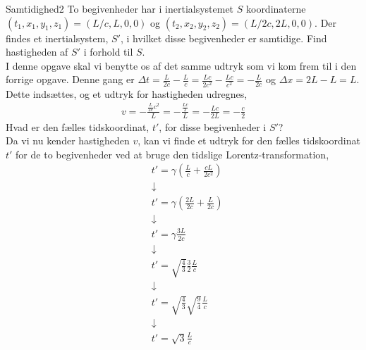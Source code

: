 \documentclass[crop=false, class=memoir]{standalone}
\begin{document}
\begin{opgave}{Samtidighed}{2}
	To begivenheder har i inertialsystemet $S$ koordinaterne $(t_1,x_1,y_1,z_1)=(L/c,L,0,0)$ og $(t_2,x_2,y_2,z_2)=(L/2c,2L,0,0)$.
	\opg Der findes et inertialsystem, $S'$, i hvilket disse begivenheder er samtidige. Find hastigheden af $S'$ i forhold til $S$.\\
	
	I denne opgave skal vi benytte os af det samme udtryk som vi kom frem til i den forrige opgave. Denne gang er $\Delta t=\frac{L}{2c}-\frac{L}{c}=\frac{Lc}{2c^2}-\frac{Lc}{c^2}=-\frac{L}{2c}$ og $\Delta x=2L-L=L$. Dette indsættes, og et udtryk for hastigheden udregnes,
	\begin{align*}
		v=-\frac{\frac{L}{2c}c^2}{L}=-\frac{\frac{Lc}{2}}{L}=-\frac{Lc}{2L}=-\frac{c}{2}
	\end{align*}
	\opg Hvad er den fælles tidskoordinat, $t'$, for disse begivenheder i $S'$?\\
	
	Da vi nu kender hastigheden $v$, kan vi finde et udtryk for den fælles tidskoordinat $t'$ for de to begivenheder ved at bruge den tidslige Lorentz-transformation,
	\begin{align*}
		&t'=\gamma(\frac{L}{c}+\frac{cL}{2c^2}) \\
		&\downarrow \\
		&t'=\gamma(\frac{2L}{2c}+\frac{L}{2c}) \\
		&\downarrow \\
		&t'=\gamma\frac{3L}{2c} \\
		&\downarrow \\
		&t'=\sqrt{\frac{4}{3}}\frac{3}{2}\frac{L}{c} \\
		&\downarrow \\
		&t'=\sqrt{\frac{4}{3}}\sqrt{\frac{9}{4}}\frac{L}{c} \\
		&\downarrow \\
		&t'=\sqrt{3}\frac{L}{c}
	\end{align*}
\end{opgave}
\end{document}
